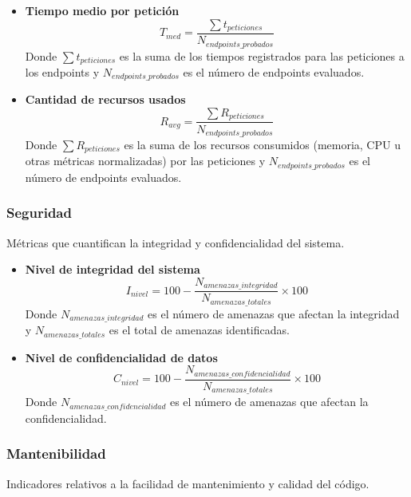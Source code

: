 \begin{itemize}
    \item \textbf{Tiempo medio por petición}
          \[
              T_{med} = \frac{\sum t_{peticiones}}{N_{endpoints\_probados}}
          \]
          Donde $\sum t_{peticiones}$ es la suma de los tiempos registrados para las peticiones a los endpoints y $N_{endpoints\_probados}$ es el número de endpoints evaluados.

    \item \textbf{Cantidad de recursos usados}
          \[
              R_{avg} = \frac{\sum R_{peticiones}}{N_{endpoints\_probados}}
          \]
          Donde $\sum R_{peticiones}$ es la suma de los recursos consumidos (memoria, CPU u otras métricas normalizadas) por las peticiones y $N_{endpoints\_probados}$ es el número de endpoints evaluados.
\end{itemize}

\subsubsection{Seguridad}

Métricas que cuantifican la integridad y confidencialidad del sistema.

\begin{itemize}
    \item \textbf{Nivel de integridad del sistema}
          \[
              I_{nivel} = 100 - \frac{N_{amenazas\_integridad}}{N_{amenazas\_totales}} \times 100
          \]
          Donde $N_{amenazas\_integridad}$ es el número de amenazas que afectan la integridad y $N_{amenazas\_totales}$ es el total de amenazas identificadas.

    \item \textbf{Nivel de confidencialidad de datos}
          \[
              C_{nivel} = 100 - \frac{N_{amenazas\_confidencialidad}}{N_{amenazas\_totales}} \times 100
          \]
          Donde $N_{amenazas\_confidencialidad}$ es el número de amenazas que afectan la confidencialidad.
\end{itemize}

\subsubsection{Mantenibilidad}

Indicadores relativos a la facilidad de mantenimiento y calidad del código.


